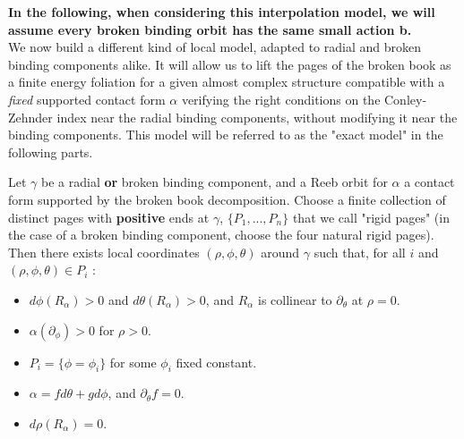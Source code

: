 \documentclass[../main.tex]{subfiles}
\begin{document}

\textbf{In the following, when considering this interpolation model, we will assume every broken binding orbit has the same small action b.}\\

We now build a different kind of local model, adapted to radial and broken binding components alike. It will allow us to lift the pages of the broken book as a finite energy foliation for a given almost complex structure compatible with a \textit{fixed} supported contact form $\alpha$ verifying the right conditions on the Conley-Zehnder index near the radial binding components, without modifying it near the binding components. This model will be referred to as the "exact model" in the following parts.

\begin{lemma}\label{l:localmodelnoint}
Let $\gamma$ be a radial \textbf{or} broken binding component, and a Reeb orbit for $\alpha$ a contact form supported by the broken book decomposition. Choose a finite collection of distinct pages with \textbf{positive }ends at $\gamma$, $\{P_1,...,P_n\}$ that we call "rigid pages" (in the case of a broken binding component, choose the four natural rigid pages). Then there exists local coordinates $(\rho,\phi,\theta)$ around $\gamma$ such that, for all $i$ and $(\rho,\phi,\theta)\in P_i$ :
\begin{itemize}
    \item $d\phi(R_\alpha)> 0$ and $d\theta(R_\alpha) >0$, and $R_\alpha$ is collinear to $\partial_\theta$ at $\rho = 0$.
    \item $\alpha(\partial_\phi)> 0$ for $\rho > 0$.
    \item $P_i = \{\phi = \phi_i\}$ for some $\phi_i$ fixed constant.
    \item $\alpha = fd\theta + gd\phi$, and $\partial_\theta f = 0$.
    \item $d\rho(R_\alpha) = 0$.
\end{itemize}
\end{lemma}
\end{document}
